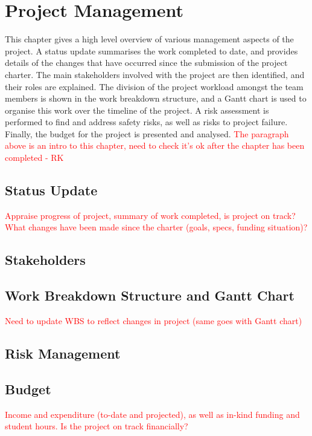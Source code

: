 \documentclass[main.tex]{subfiles}
\begin{document}
\chapter{Project Management}
This chapter gives a high level overview of various management aspects of the project. A status update summarises the work completed to date, and provides details of the changes that have occurred since the submission of the project charter. The main stakeholders involved with the project are then identified, and their roles are explained. The division of the project workload amongst the team members is shown in the work breakdown structure, and a Gantt chart is used to organise this work over the timeline of the project. A risk assessment is performed to find and address safety risks, as well as risks to project failure. Finally, the budget for the project is presented and analysed.  
\textcolor{red}{The paragraph above is an intro to this chapter, need to check it's ok after the chapter has been completed - RK}
\section{Status Update}
\textcolor{red}{Appraise progress of project, summary of work completed, is project on track? What changes have been made since the charter (goals, specs, funding situation)?}
\section{Stakeholders}

\section{Work Breakdown Structure and Gantt Chart}
\textcolor{red}{Need to update WBS to reflect changes in project (same goes with Gantt chart)}
\section{Risk Management}
\section{Budget}
\textcolor{red}{Income and expenditure (to-date and projected), as well as in-kind funding and student hours. Is the project on track financially?}
\end{document}
